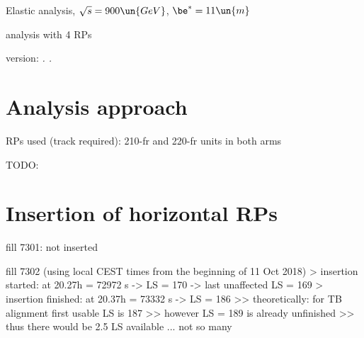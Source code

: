 

\def\baseDir{/afs/cern.ch/work/j/jkaspar/work/analyses/elastic/450GeV/beta11/4rp/}


\hbox{}
\vskip-10mm

\centerline{\SetFontSizesXX Elastic analysis, $\sqrt s = 900\un{GeV}$, $\be^* = 11\un{m}$}
\vskip2mm
\centerline{\SetFontSizesXX analysis with 4 RPs }
\vskip2mm
\centerline{version: {\it \number\day. \number\month. \number\year}}

\vfil
\InsertToc

\vfil
\eject

\BeginText

\chapter{Analysis approach}

\> RPs used (track required): 210-fr and 220-fr units in both arms

\> TODO: 


\chapter{Insertion of horizontal RPs}

\> fill 7301: not inserted

\> fill 7302 (using local CEST times from the beginning of 11 Oct 2018)
\>> insertion started: at 20.27h = 72972 s -> LS = 170 -> last unaffected LS = 169
\>> insertion finished: at 20.37h = 73332 s -> LS = 186
\>>> theoretically: for TB alignment first usable LS is 187
\>>> however LS = 189 is already unfinished
\>>> thus there would be 2.5 LS available ... not so many




\EndText
\bye
